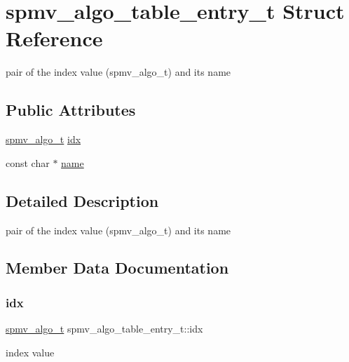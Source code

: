 \hypertarget{structspmv__algo__table__entry__t}{}\section{spmv\+\_\+algo\+\_\+table\+\_\+entry\+\_\+t Struct Reference}
\label{structspmv__algo__table__entry__t}


pair of the index value (spmv\+\_\+algo\+\_\+t) and its name  


\subsection*{Public Attributes}
\begin{DoxyCompactItemize}
\item 
\hyperlink{spmv_8cc_ad2cf0493af54bf76c5be68b4634fcab7}{spmv\+\_\+algo\+\_\+t} \hyperlink{structspmv__algo__table__entry__t_a0ef60703788aaa74667e3bec5f44696d}{idx}
\item 
const char $\ast$ \hyperlink{structspmv__algo__table__entry__t_a0d9006dae288632b43113eeef8aa9f11}{name}
\end{DoxyCompactItemize}


\subsection{Detailed Description}
pair of the index value (spmv\+\_\+algo\+\_\+t) and its name 

\subsection{Member Data Documentation}
\mbox{\label{structspmv__algo__table__entry__t_a0ef60703788aaa74667e3bec5f44696d}} 
\subsubsection{\texorpdfstring{idx}{idx}}
{\footnotesize\ttfamily \hyperlink{spmv_8cc_ad2cf0493af54bf76c5be68b4634fcab7}{spmv\+\_\+algo\+\_\+t} spmv\+\_\+algo\+\_\+table\+\_\+entry\+\_\+t\+::idx}

index value \mbox{\label{structspmv__algo__table__entry__t_a0d9006dae288632b43113eeef8aa9f11}} 
